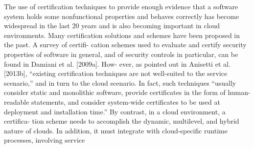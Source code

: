\documentclass[../main.tex]{subfiles}
\begin{document}
The use of certification techniques to provide enough evidence that a software system
holds some nonfunctional properties and behaves correctly has become widespread
in the last 20 years and is also becoming important in cloud environments. Many
certification solutions and schemes have been proposed in the past. A survey of certifi-
cation schemes used to evaluate and certify security properties of software in general,
and of security controls in particular, can be found in Damiani et al. [2009a]. How-
ever, as pointed out in Anisetti et al. [2013b], “existing certification techniques are not
well-suited to the service scenario,” and in turn to the cloud scenario. In fact, such
techniques “usually consider static and monolithic software, provide certificates in the
form of human-readable statements, and consider system-wide certificates to be used
at deployment and installation time.” By contrast, in a cloud environment, a certifica-
tion scheme needs to accomplish the dynamic, multilevel, and hybrid nature of clouds.
In addition, it must integrate with cloud-specific runtime processes, involving service
\end{document}
